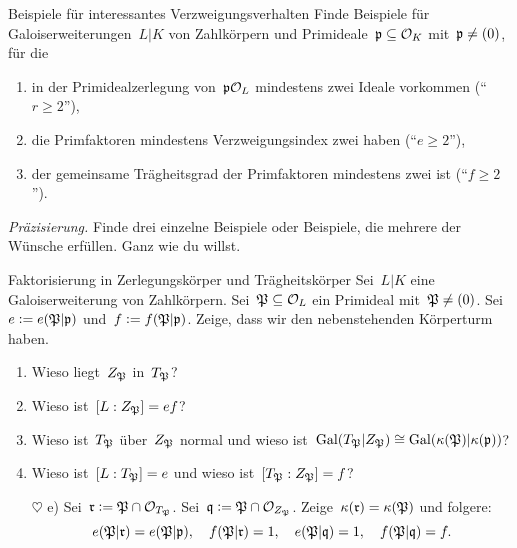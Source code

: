 \documentclass[entwurf]{uebblatt}
\begin{document}

\begin{aufgabe}{Beispiele für interessantes Verzweigungsverhalten}
Finde Beispiele für Galoiserweiterungen~$L|K$ von Zahlkörpern und
Primideale~$\mathfrak{p} \subseteq \mathcal{O}_K$ mit~$\mathfrak{p} \neq (0)$, für die
\begin{enumerate}
\item in der Primidealzerlegung von~$\mathfrak{p}\mathcal{O}_L$ mindestens zwei Ideale vorkommen
("`$r \geq 2$"'),
\item die Primfaktoren mindestens Verzweigungsindex zwei haben ("`$e \geq 2$"'),
\item der gemeinsame Trägheitsgrad der Primfaktoren mindestens zwei ist ("`$f \geq 2$"').
\end{enumerate}
{\tiny\emph{Präzisierung.} Finde drei einzelne Beispiele oder Beispiele, die
mehrere der Wünsche erfüllen. Ganz wie du willst.\par}
\end{aufgabe}

\begin{aufgabe}{Faktorisierung in Zerlegungskörper und Trägheitskörper}
Sei~$L|K$ eine Galoiserweiterung von Zahlkörpern. Sei~$\mathfrak{P} \subseteq \mathcal{O}_L$ ein
Primideal mit~$\mathfrak{P} \neq (0)$. Sei~$e \vcentcolon= e(\mathfrak{P}|\mathfrak{p})$ und~$f \vcentcolon= f(\mathfrak{P}|\mathfrak{p})$.
Zeige, dass wir den nebenstehenden Körperturm haben.
\begin{enumerate}
\item Wieso liegt~$Z_{\mathfrak{P}}$ in~$T_{\mathfrak{P}}$?
\item Wieso ist~$[L : Z_{\mathfrak{P}}] = ef$?
\item Wieso ist~$T_{\mathfrak{P}}$ über~$Z_{\mathfrak{P}}$ normal und wieso ist~$\mathrm{Gal}(T_{\mathfrak{P}}|Z_{\mathfrak{P}}) \cong \mathrm{Gal}(\kappa(\mathfrak{P})|\kappa(\mathfrak{p}))$?
\item Wieso ist~$[L : T_{\mathfrak{P}}] = e$ und wieso ist~$[T_{\mathfrak{P}} : Z_{\mathfrak{P}}] = f$?
\item[$\heartsuit$ e)] Sei~$\mathfrak{r} \vcentcolon= \mathfrak{P} \cap \mathcal{O}_{T_{\mathfrak{P}}}$.
Sei~$\mathfrak{q} \vcentcolon= \mathfrak{P} \cap \mathcal{O}_{Z_{\mathfrak{P}}}$. Zeige~$\kappa(\mathfrak{r}) = \kappa(\mathfrak{P})$ und folgere:
\[ e(\mathfrak{P}|\mathfrak{r}) = e(\mathfrak{P}|\mathfrak{p}), \quad
  f(\mathfrak{P}|\mathfrak{r}) = 1, \quad
  e(\mathfrak{P}|\mathfrak{q}) = 1, \quad
  f(\mathfrak{P}|\mathfrak{q}) = f. \]
\end{enumerate}
\end{aufgabe}
\end{document}

